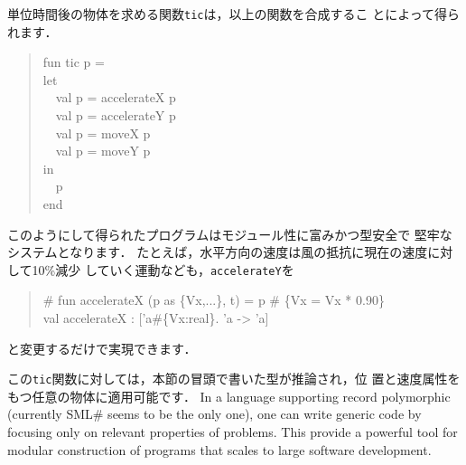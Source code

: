 \documentclass{jbook}
\newcommand{\smlsharp}{SML\#}
\newcommand{\myem}{\mbox{\ \ }}
\begin{document}
	単位時間後の物体を求める関数{\tt tic}は，以上の関数を合成するこ
とによって得られます．
\begin{tt}\begin{quote}
fun tic p =\\
let\\
\myem  val p = accelerateX p\\
\myem  val p = accelerateY p\\
\myem  val p = moveX p\\
\myem  val p = moveY p\\
in\\
\myem  p\\
end
\end{quote}\end{tt}
	このようにして得られたプログラムはモジュール性に富みかつ型安全で
堅牢なシステムとなります．
	たとえば，水平方向の速度は風の抵抗に現在の速度に対して10\%減少
していく運動なども，{\tt accelerateY}を
\begin{tt}\begin{quote}
\# fun accelerateX (p as \{Vx,...\}, t) = p \# \{Vx = Vx * 0.90\}\\
val accelerateX : ['a\#\{Vx:real\}. 'a -> 'a]\\
\end{quote}\end{tt}
と変更するだけで実現できます．

	この{\tt tic}関数に対しては，本節の冒頭で書いた型が推論され，位
置と速度属性をもつ任意の物体に適用可能です．
\else%
	In a language supporting record polymorphic (currently
\smlsharp{} seems to be the only one), one can write generic code by
focusing only on relevant properties of problems.
	This provide a powerful tool for modular construction of
programs that scales to large software development.
	
\end{document}
